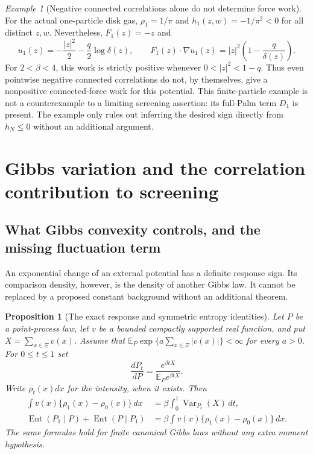 \documentclass[11pt,a4paper]{article}
\numberwithin{equation}{section}
\newtheorem{proposition}[theorem]{Proposition}
\theoremstyle{definition}
\theoremstyle{remark}
\newtheorem{example}[theorem]{Example}
\begin{document}
\begin{example}[Negative connected correlations alone do not determine force work]
\label{ex:screening-negative-correlation-insufficient}
For the actual one-particle disk gas, $\rho_1=1/\pi$ and
$h_1(z,w)=-1/\pi^2<0$ for all distinct $z,w$. Nevertheless,
$F_1(z)=-z$ and
\[
 u_1(z)=-\frac{|z|^2}2-\frac q2\log\delta(z),\qquad
 F_1(z)\cdot\nabla u_1(z)
 =|z|^2\left(1-\frac q{\delta(z)}\right).
\]
For $2<\beta<4$, this work is strictly positive whenever
$0<|z|^2<1-q$. Thus even pointwise negative connected correlations do
not, by themselves, give a nonpositive connected-force work for this
potential. This finite-particle example is not a counterexample to a
limiting screening assertion: its full-Palm term $D_1$ is present.
The example only rules out inferring the desired sign directly from
$h_N\le0$ without an additional argument.
\end{example}


\section{Gibbs variation and the correlation contribution to screening}
\label{sec:screening-gibbs-variation}
\subsection{What Gibbs convexity controls, and the missing fluctuation term}
\label{subsec:screening-gibbs-variational-audit}

An exponential change of an external potential has a definite response
sign.  Its comparison density, however, is the density of another Gibbs
law.  It cannot be replaced by a proposed constant background without
an additional theorem.

\begin{proposition}[The exact response and symmetric entropy identities]
\label{prop:screening-exact-tilt-response}
Let $P$ be a point-process law, let $v$ be a bounded compactly supported
real function, and put $X=\sum_{x\in\Xi}v(x)$.  Assume that
$\mathbb E_P\exp\{a\sum_{x\in\Xi}|v(x)|\}<\infty$ for every $a>0$.  For $0\le t\le1$ set
\[
 \frac{dP_t}{dP}=\frac{e^{\beta tX}}{\mathbb E_Pe^{\beta tX}}.
\]
Write $\rho_t(x)dx$ for the intensity, when it exists.  Then
\begin{align}
 \int v(x)\{\rho_1(x)-\rho_0(x)\}\,dx
 &=\beta\int_0^1\operatorname{Var}_{P_t}(X)\,dt,\label{eq:screening-response-variance}\\
 \operatorname{Ent}(P_1\mid P)+\operatorname{Ent}(P\mid P_1)
 &=\beta\int v(x)\{\rho_1(x)-\rho_0(x)\}\,dx.
 \label{eq:screening-response-symmetric-entropy}
\end{align}
The same formulas hold for finite canonical Gibbs laws without any
extra moment hypothesis.
\end{proposition}
\end{document}
